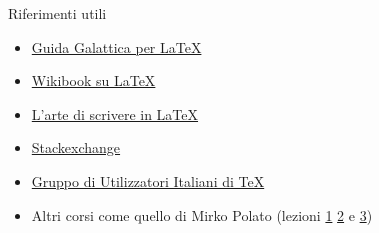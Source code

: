 \begin{frame}{Riferimenti utili}
	\begin{itemize}
		\item {\href{https://github.com/R-and-LaTeX/GuidaGalatticaPerLaTeX/releases/download/v0.1.0/GuidaGalatticaPerLaTeX.pdf}
		{Guida Galattica per \LaTeX{}}}
		\item {\href{https://en.wikibooks.org/wiki/LaTeX/}{Wikibook su LaTeX}}
		\item {\href{http://www.lorenzopantieri.net/LaTeX_files/ArteLaTeX.pdf}
		{L'arte di scrivere in LaTeX}}
		\item {\href{https://tex.stackexchange.com/}{Stackexchange}}
		\item {\href{http://www.guitex.org/}
		{Gruppo di Utilizzatori Italiani di TeX}}
		\item Altri corsi come quello di Mirko Polato (lezioni
		{\href{http://www.math.unipd.it/~mpolato/didattica/latex/lesson_1.pdf}
		{1}}
		{\href{http://www.math.unipd.it/~mpolato/didattica/latex/lesson_2.pdf}
		{2}}
		 e 
		{\href{http://www.math.unipd.it/~mpolato/didattica/latex/lesson_3.pdf}
		{3}})
	\end{itemize}
\end{frame}
